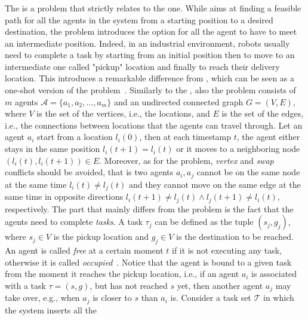 \subsubsection{}
The  is a problem that strictly relates to the  one. 
While \MAPF aims at finding a feasible path for all the agents in the system 
from a starting position to a desired destination, the  problem 
introduces the option for all the agent to have to meet an intermediate 
position. Indeed, in an industrial environment, robots usually need to complete
a task by starting from an initial position then to move to an intermediate one 
called "pickup" location and finally to reach their delivery location. \newline
This introduces a remarkable difference from , which can be seen as
a one-shot version of the problem~\cite{onlineMAPD}.\newline
Similarly to the \MAPF, also the  problem consists of $m$ agents
$\mathcal{A}=\{a_1,a_2,\hdots,a_m\}$ and an undirected connected graph 
$G=(V,E)$, where $V$ is the set of the vertices, i.e., the locations, and $E$
is the set of the edges, i.e., the connections between locations that the
agents can travel through. Let an agent $a_i$ start from a location $l_i(0)$,
then at each timestamp $t$, the agent either stays in the same position
$l_i(t+1)=l_i(t)$ or it moves to a neighboring node $(l_i(t), l_i(t+1))\in E$.
Moreover, as for the \MAPF problem, \textit{vertex} and \textit{swap} conflicts
should be avoided, that is two agents $a_i, a_j$ cannot be on the same node at 
the same time $l_i(t)\neq l_j(t)$ and they cannot move on the same edge at the
same time in opposite directions $l_i(t+1)\neq l_j(t) \wedge l_j(t+1)\neq
l_i(t)$, respectively. \newline
The part that mainly differs from the \MAPF problem is the fact that the agents
need to complete \textit{tasks}. A task $\tau_j$ can be defined as the tuple
$(s_j,g_j)$, where $s_j\in V$ is the pickup location and $g_j\in V$ is the 
destination to be reached. An agent is called \textit{free} at a certain moment
$t$ if it is not executing any task, otherwise it is called 
\textit{occupied}~\cite{onlineMAPD}. Notice that the agent is bound to a given
task from the moment it reaches the pickup location, i.e., if an agent $a_i$ is
associated with a task $\tau=(s, g)$, but has not reached $s$ yet, then another
agent $a_j$ may take over, e.g., when $a_j$ is closer to $s$ than $a_i$ is.
Consider a task set $\mathcal{T}$ in which the system inserts all the 
